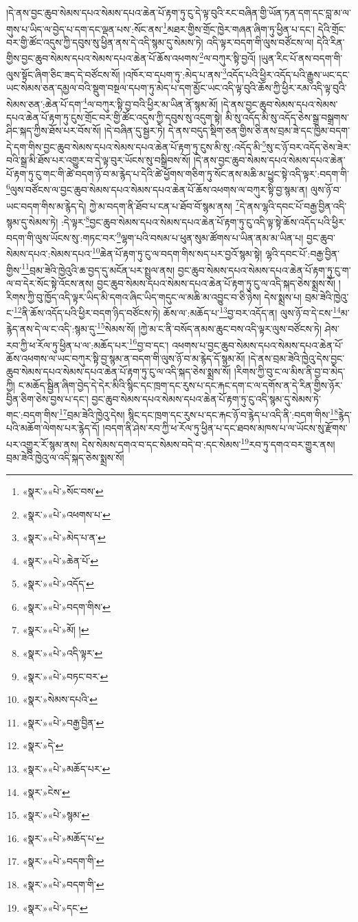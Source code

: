 །དེ་ནས་བྱང་ཆུབ་སེམས་དཔའ་སེམས་དཔའ་ཆེན་པོ་རྟག་ཏུ་ངུ་དེ་ལྟ་བུའི་རང་བཞིན་གྱི་ཡོན་ཏན་དག་དང་བླ་མ་ལ་གུས་པ་ཡིད་ལ་བྱེད་པ་དག་དང་ལྡན་པས་:སོང་ནས་\footnote{«སྣར་»«པེ་»སོང་བས་}མཐར་གྱིས་གྲོང་ཁྱེར་གཞན་ཞིག་ཏུ་ཕྱིན་པ་དང་། དེའི་གྲོང་བར་གྱི་ཚོང་འདུས་ཀྱི་དབུས་སུ་ཕྱིན་ནས་དེ་འདི་སྙམ་དུ་སེམས་ཏེ། འདི་ལྟར་བདག་གི་ལུས་བཙོངས་ལ། དེའི་རིན་གྱིས་བྱང་ཆུབ་སེམས་དཔའ་སེམས་དཔའ་ཆེན་པོ་ཆོས་འཕགས་\footnote{«སྣར་»«པེ་»འཕགས་པ་}ལ་བཀུར་སྟི་བྱའོ། །ཡུན་རིང་པོ་ནས་བདག་གི་ལུས་སྟོང་ཞིག་ཅིང་ཟད་དེ་བཙོངས་སོ། །འཁོར་བ་དཔག་ཏུ་:མེད་པ་ནས་\footnote{«སྣར་»«པེ་»མེད་པ་ན་}འདོད་པའི་ཕྱིར་འདོད་པའི་རྒྱུས་ཡང་དང་ཡང་སེམས་ཅན་དམྱལ་བའི་སྡུག་བསྔལ་དཔག་ཏུ་མེད་པ་དག་མྱོང་ཡང་འདི་ལྟ་བུའི་ཆོས་ཀྱི་ཕྱིར་རམ་འདི་ལྟ་བུའི་སེམས་ཅན་:ཆེན་པོ་དག་\footnote{«སྣར་»«པེ་»ཆེན་པོ་}ལ་བཀུར་སྟི་བྱ་བའི་ཕྱིར་མ་ཡིན་ནོ་སྙམ་མོ། །དེ་ནས་བྱང་ཆུབ་སེམས་དཔའ་སེམས་དཔའ་ཆེན་པོ་རྟག་ཏུ་ངུས་གྲོང་བར་གྱི་ཚོང་འདུས་ཀྱི་དབུས་སུ་འདུག་སྟེ། མི་སུ་འདོད་མི་སུ་འདོད་ཅེས་སྒྲ་བསྒྲགས་ཤིང་སྐད་ཀྱིས་ཐོས་པར་བོས་སོ། །དེ་བཞིན་དུ་སྦྱར་ཏེ། དེ་ནས་བདུད་སྡིག་ཅན་གྱིས་ཅི་ནས་བྲམ་ཟེ་དང་ཁྱིམ་བདག་དེ་དག་གིས་བྱང་ཆུབ་སེམས་དཔའ་སེམས་དཔའ་ཆེན་པོ་རྟག་ཏུ་ངུས་མི་སུ་:འདོད་མི་\footnote{«སྣར་»«པེ་»འདོད་}སུ་ང་ཉོ་བར་འདོད་ཅེས་ཟེར་བའི་སྒྲ་མི་ཐོས་པར་འགྱུར་བ་དེ་ལྟ་བུར་ཡོངས་སུ་བསྒྲིབས་སོ། །དེ་ནས་བྱང་ཆུབ་སེམས་དཔའ་སེམས་དཔའ་ཆེན་པོ་རྟག་ཏུ་ངུ་གང་གི་ཚེ་བདག་ཉོ་བ་མ་རྙེད་པ་དེའི་ཚེ་ཕྱོགས་གཅིག་ཏུ་སོང་ནས་མཆི་མ་ཕྱུང་སྟེ་འདི་ལྟར་:བདག་གི་\footnote{«སྣར་»«པེ་»བདག་གིས་}ལུས་བཙོངས་ལ་བྱང་ཆུབ་སེམས་དཔའ་སེམས་དཔའ་ཆེན་པོ་ཆོས་འཕགས་ལ་བཀུར་སྟི་བྱ་སྙམ་ན། ལུས་ཉོ་བ་ཡང་བདག་གིས་མ་རྙེད་དེ། ཀྱེ་མ་བདག་ནི་ཐོབ་པ་ངན་པ་ཐོབ་བོ་སྙམ་ནས། \footnote{«སྣར་»«པེ་»མོ། ། }དེ་ནས་ལྷའི་དབང་པོ་བརྒྱ་བྱིན་འདི་སྙམ་དུ་སེམས་ཏེ། :དེ་ལྟར་\footnote{«སྣར་»«པེ་»འདི་ལྟར་}བྱང་ཆུབ་སེམས་དཔའ་སེམས་དཔའ་ཆེན་པོ་རྟག་ཏུ་ངུ་འདི་ལྟ་སྟེ་ཆོས་འདོད་པའི་ཕྱིར་བདག་གི་ལུས་ཡོངས་སུ་:གཏང་བར་\footnote{«སྣར་»«པེ་»བཏང་བར་}ལྷག་པའི་བསམ་པ་ཕུན་སུམ་ཚོགས་པ་ཡིན་ནམ་མ་ཡིན་པ། བྱང་ཆུབ་སེམས་དཔའ་:སེམས་དཔའ་\footnote{«སྣར་»སེམས་དཔའི་}ཆེན་པོ་རྟག་ཏུ་ངུ་ལ་བདག་གིས་སད་པར་བྱའོ་སྙམ་སྟེ། ལྷའི་དབང་པོ་:བརྒྱ་བྱིན་གྱིས་\footnote{«སྣར་»«པེ་»བརྒྱ་བྱིན་}བྲམ་ཟེའི་ཁྱེའུའི་ཆ་བྱད་དུ་མངོན་པར་སྤྲུལ་ནས། བྱང་ཆུབ་སེམས་དཔའ་སེམས་དཔའ་ཆེན་པོ་རྟག་ཏུ་ངུ་ག་ལ་བ་དེར་སོང་སྟེ་འོངས་ནས། བྱང་ཆུབ་སེམས་དཔའ་སེམས་དཔའ་ཆེན་པོ་རྟག་ཏུ་ངུ་ལ་འདི་སྐད་ཅེས་སྨྲས་སོ། །རིགས་ཀྱི་བུ་ཁྱོད་འདི་ལྟར་ཡིད་མི་དགའ་ཞིང་ཡིད་གདུང་ལ་མཆི་མ་འབྱུང་བ་ཅི་ཉེས། དེས་སྨྲས་པ། བྲམ་ཟེའི་ཁྱེའུ་ང་\footnote{«སྣར་»དེ་}ནི་ཆོས་འདོད་པའི་ཕྱིར་བདག་ཉིད་བཙོངས་ཏེ། ཆོས་ལ་:མཆོད་པ་\footnote{«སྣར་»«པེ་»མཆོད་པར་}བྱ་བར་འདོད་ན། ལུས་ཉོ་བ་དེ་ངས་\footnote{«སྣར་»ངེས་}མ་རྙེད་ནས་དེ་ལ་ང་འདི་:སྙམ་དུ་\footnote{«སྣར་»«པེ་»སྙམ་}སེམས་སོ། །ཀྱེ་མ་ང་ནི་བསོད་ནམས་ཆུང་བས་འདི་ལྟར་ལུས་བཙོངས་ཏེ། ཤེས་རབ་ཀྱི་ཕ་རོལ་ཏུ་ཕྱིན་པ་ལ་:མཆོད་པར་\footnote{«སྣར་»«པེ་»མཆོད་པ་}བྱ་བ་དང་། འཕགས་པ་བྱང་ཆུབ་སེམས་དཔའ་སེམས་དཔའ་ཆེན་པོ་ཆོས་འཕགས་ལ་ཡང་བཀུར་སྟི་བྱ་སྙམ་ན་བདག་གི་ལུས་ཉོ་བ་མ་རྙེད་དོ་སྙམ་མོ། །དེ་ནས་བྲམ་ཟེའི་ཁྱེའུ་དེས་བྱང་ཆུབ་སེམས་དཔའ་སེམས་དཔའ་ཆེན་པོ་རྟག་ཏུ་ངུ་ལ་འདི་སྐད་ཅེས་སྨྲས་སོ། །རིགས་ཀྱི་བུ་ང་ལ་མིས་ནི་བྱ་བ་མེད་ཀྱི། ང་མཆོད་སྦྱིན་ཞིག་བྱེད་དེ་དེར་མིའི་སྙིང་དང་ཁྲག་དང་རུས་པ་དང་རྐང་དག་ང་ལ་དགོས་ན་དེ་རིན་གྱིས་ཉོར་བྱིན་ཅིག་ཅེས་བྱས་པ་དང་། བྱང་ཆུབ་སེམས་དཔའ་སེམས་དཔའ་ཆེན་པོ་རྟག་ཏུ་ངུ་འདི་སྙམ་དུ་སེམས་ཏེ་གང་:བདག་གིས་\footnote{«སྣར་»«པེ་»བདག་གི་}བྲམ་ཟེའི་ཁྱེའུ་དེས། སྙིང་དང་ཁྲག་དང་རུས་པ་དང་རྐང་ཉོ་བ་རྙེད་པ་འདི་ནི་:བདག་གིས་\footnote{«སྣར་»«པེ་»བདག་གི་}རྙེད་པའི་མཆོག་ལེགས་པར་རྙེད་དོ། །བདག་ནི་ཤེས་རབ་ཀྱི་ཕ་རོལ་ཏུ་ཕྱིན་པ་དང་ཐབས་མཁས་པ་ལ་ཡོངས་སུ་རྫོགས་པར་འགྱུར་རོ་སྙམ་ནས། དེས་སེམས་དགའ་བ་དང་སེམས་བདེ་བ་:དང་སེམས་\footnote{«སྣར་»«པེ་»དང་}རབ་ཏུ་དགའ་བར་གྱུར་ནས། བྲམ་ཟེའི་ཁྱེའུ་ལ་འདི་སྐད་ཅེས་སྨྲས་སོ། 